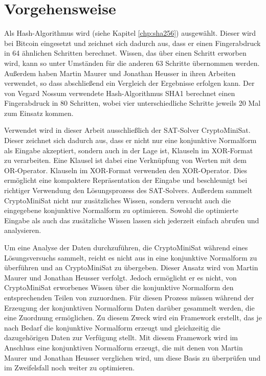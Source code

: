 \section{Vorgehensweise}

Als Hash-Algorithmus wird  (siehe Kapitel \ref{chp:sha256}) ausgewählt. Dieser wird bei Bitcoin eingesetzt
und zeichnet sich dadurch aus, dass er einen Fingerabdruck in 64 ähnlichen Schritten berechnet. Wissen, das über einen Schritt
erworben wird, kann so unter Umständen für die anderen 63 Schritte übernommen werden. Außerdem haben Martin Maurer und Jonathan
Heusser  in ihren Arbeiten verwendet, so dass abschließend ein Vergleich der Ergebnisse erfolgen kann. Der von Vegard Nossum
verwendete Hash-Algorithmus SHA1 berechnet einen Fingerabdruck in 80 Schritten, wobei vier unterschiedliche Schritte jeweils 20 Mal
zum Einsatz kommen.

Verwendet wird in dieser Arbeit ausschließlich der SAT-Solver CryptoMiniSat. Dieser zeichnet sich dadurch aus, dass er nicht nur
eine konjunktive Normalform als Eingabe akzeptiert, sondern auch in der Lage ist, Klauseln im XOR-Format zu verarbeiten. Eine Klausel
ist dabei eine Verknüpfung von Werten mit dem OR-Operator. Klauseln im XOR-Format verwenden den XOR-Operator. Dies ermöglicht
eine kompaktere Repräsentation der Eingabe und beschleunigt bei richtiger Verwendung den Lösungsprozess des SAT-Solvers.
Außerdem sammelt CryptoMiniSat nicht nur zusätzliches Wissen, sondern versucht auch die eingegebene konjunktive Normalform zu
optimieren. Sowohl die optimierte Eingabe als auch das zusätzliche Wissen lassen sich jederzeit einfach abrufen und analysieren.

Um eine Analyse der Daten durchzuführen, die CryptoMiniSat während eines Lösungsversuchs sammelt, reicht es nicht aus 
in eine konjunktive Normalform zu überführen und an CryptoMiniSat zu übergeben. Dieser Ansatz wird von Martin Maurer und Jonathan
Heusser verfolgt. Jedoch ermöglicht er es nicht, von CryptoMiniSat erworbenes Wissen über die konjunktive Normalform den
entsprechenden Teilen von  zuzuordnen. Für diesen Prozess müssen während der Erzeugung der konjunktiven Normalform
Daten darüber gesammelt werden, die eine Zuordnung ermöglichen. Zu diesem Zweck wird ein Framework erstellt, das je nach Bedarf
die konjunktive Normalform erzeugt und gleichzeitig die dazugehörigen Daten zur Verfügung stellt. Mit diesem Framework wird
im Anschluss eine konjunktiven Normalform erzeugt, die mit denen von Martin Maurer und Jonathan Heusser
verglichen wird, um diese Basis zu überprüfen und im Zweifelsfall noch weiter zu optimieren.

